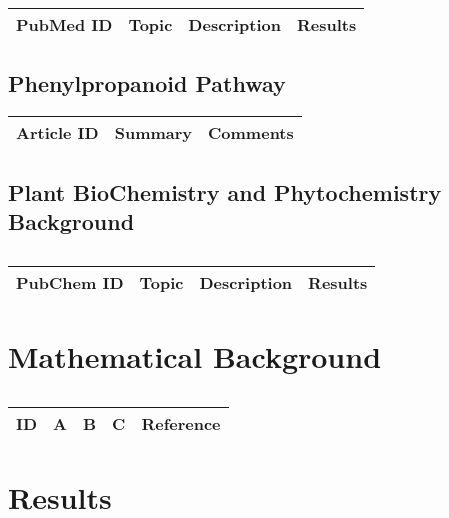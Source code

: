 \centering	
\begin{table}[H]\tiny
	\caption{}	
	\begin{tabular}{p{1cm}p{1cm}|p{4cm}|l}
		\hline	
		PubMed ID & Topic & Description & Results \\
		\hline 
		\hline 
	\end{tabular}
\end{table}

\subsection{Phenylpropanoid Pathway}

\begin{table}[H]\centering
	\begin{tabular}{p{1cm}p{4cm}p{3cm}}
		Article ID & Summary & Comments\\
		\hline
		\hline
	\end{tabular}
\end{table}

\subsection{Plant BioChemistry and Phytochemistry Background}
\centering	
\begin{table}[H]\tiny
	\caption{}	
	\begin{tabular}{p{1cm}p{1cm}|p{4cm}|l}
		\hline	
		PubChem ID & Topic & Description & Results \\
		\hline 
		\hline 
	\end{tabular}
\end{table}

\section{Mathematical Background}

\centering
\begin{table}[H]\footnotesize
	\caption{}
	\begin{tabular}{rp{1cm}p{2cm}p{3cm}p{1cm}}
		\hline
		ID & A & B & C & Reference \\
		\hline
		\hline
	\end{tabular}
\end{table}
\raggedright


\section{Results}




